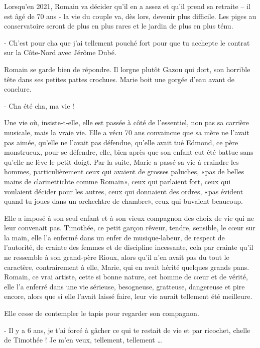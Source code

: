 Lorsqu’en 2021, Romain va décider qu’il en a assez et qu’il prend sa retraite – il est âgé de 70 ans - la vie du couple va, dès lors, devenir plus difficile. Les piges au conservatoire seront de plus en plus rares et le jardin de plus en plus ténu.

- Ch’est pour cha que j’ai tellement pouché fort pour que tu acchepte le contrat sur la Côte-Nord avec Jérôme Dubé.

Romain se garde bien de répondre. Il lorgne plutôt Gazou qui dort, son horrible tête dans ses petites pattes crochues. Marie boit une gorgée d’eau avant de conclure.

- Cha été cha, ma vie !

Une vie où, insiste-t-elle, elle est passée à côté de l’essentiel, non pas sa carrière musicale, mais la vraie vie. Elle a vécu 70 ans convaincue que sa mère ne l’avait pas aimée, qu’elle ne l’avait pas défendue, qu’elle avait tué Edmond, ce père monstrueux, pour se défendre, elle, bien après que son enfant eut été battue sans qu’elle ne lève le petit doigt. Par la suite, Marie a passé sa vie à craindre les hommes, particulièrement ceux qui avaient de grosses paluches, «pas de belles mains de clarinettichte comme Romain», ceux qui parlaient fort, ceux qui voulaient décider pour les autres, ceux qui donnaient des ordres, «pas évident quand tu joues dans un orchechtre de chambre», ceux qui buvaient beaucoup.

Elle a imposé à son seul enfant et à son vieux compagnon des choix de vie qui ne leur convenait pas. Timothée, ce petit garçon rêveur, tendre, sensible, le cœur sur la main, elle l’a enfermé dans un enfer de musique-labeur, de respect de l’autorité, de crainte des femmes et de discipline incessante, cela par crainte qu’il ne ressemble à son grand-père Rioux, alors qu’il n’en avait pas du tout le caractère, contrairement à elle, Marie, qui en avait hérité quelques grands pans. Romain, ce vrai artiste, cette si bonne nature, cet homme de cœur et de vérité, elle l’a enferré dans une vie sérieuse, besogneuse, gratteuse, dangereuse et pire encore, alors que si elle l’avait laissé faire, leur vie aurait tellement été meilleure.

Elle cesse de contempler le tapis pour regarder son compagnon.

- Il y a 6 ans, je t’ai forcé à gâcher ce qui te restait de vie et par ricochet, chelle de Timothée ! Je m’en veux, tellement, tellement …

